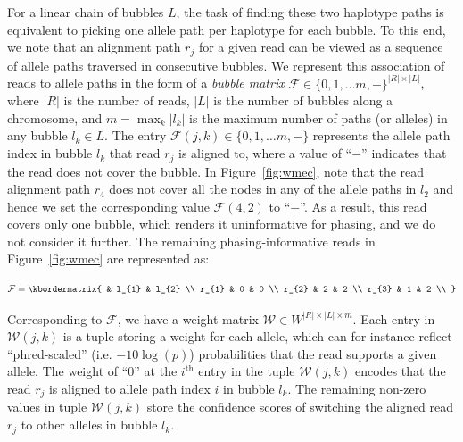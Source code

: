 For a linear chain of bubbles $L$, the task of finding these two haplotype paths is equivalent to picking one allele path per haplotype for each bubble.
To this end, we note that an alignment path $r_j$ for a given read can be viewed as a sequence of allele paths traversed in consecutive bubbles. 
We represent this association of reads to allele paths in the form of a \emph{bubble matrix} $\mathcal{F}\in\{0,1, \ldots m, -\}^{|R|\times |L|}$, where $|R|$ is the number of reads, $|L|$ is the number of bubbles along a chromosome, and $m = \max_k|l_k|$ is the maximum number of  paths (or alleles) in any bubble $l_k\in L$.
The entry $\mathcal{F}(j,k) \in \{0, 1, \ldots m, -\}$ represents the allele path index in bubble $l_k$ that read $r_j$ is aligned to, where a value of ``$-$'' indicates that the read does not cover the bubble.
In Figure~\ref{fig:wmec}, note that the read alignment path $r_4$ does not cover all the nodes in any of the allele paths in $l_2$ and hence we set the corresponding value $\mathcal{F}(4,2)$ to ``$-$''.
As a result, this read covers only one bubble, which renders it uninformative for phasing, and we do not consider it further.
The remaining phasing-informative reads in Figure~\ref{fig:wmec} are represented as:

\begin{equation}\label{eq:bubble_matrix}
  \mathcal{F}  = \kbordermatrix{
     & l_{1}       & l_{2}  \\
    r_{1}       & 0 & 0 \\
    r_{2}       & 2 & 2 \\
    r_{3}       & 1 & 2 \\
  }
\end{equation}

Corresponding to $\mathcal{F}$, we have a weight matrix $\mathcal{W}\in W^{|R|\times |L|\times m}$. %
Each entry in $\mathcal{W}(j,k)$ is a tuple storing a weight for each allele, which can for instance reflect ``phred-scaled'' (i.e. $-10\log(p)$) probabilities that the read supports a given allele.
The weight of ``0'' at the $i^\text{th}$ entry in the tuple $\mathcal{W}(j,k)$ encodes that the read $r_j$ is aligned to allele path index $i$ in bubble $l_k$.
The remaining non-zero values in tuple $\mathcal{W}(j,k)$ store the confidence scores of switching the aligned read $r_j$ to other alleles in bubble $l_k$.

